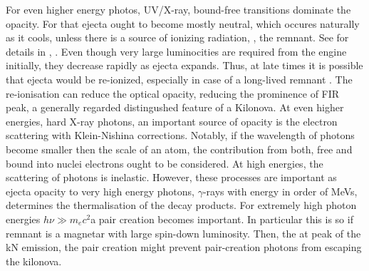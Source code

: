 %
For even higher energy photos, \ac{UV}/X-ray, bound-free transitions dominate the opacity. 
For that ejecta ought to become mostly neutral, which occures naturally as it cools, unless 
there is a source of ionizing radiation, \eg, the remnant. 
See for details in \eg, \citet{Metzger:2013cha}. 
Even though very large luminocities are required from the engine initially, 
they decrease rapidly as ejecta expands. Thus, at late times it is possible that ejecta would be 
re-ionized, especially in case of a long-lived remnant \citep{Metzger:2013cha}. The re-ionisation 
can reduce the optical opacity, reducing the prominence of \ac{FIR} peak, 
a generally regarded distingushed feature of a Kilonova.
%
At even higher energies, hard X-ray photons, an important source of opacity is the 
electron scattering with Klein-Nishina corrections. Notably, if the wavelength of photons 
become smaller then the scale of an atom, the contribution from both, free and bound into 
nuclei electrons ought to be considered. At high energies, the scattering of photons is inelastic. 
However, these processes are important as ejecta opacity to very high energy photons, 
$\gamma$-rays with energy in order of MeVs, determines the thermalisation of the \rproc{} decay products.
%
For extremely high photon energies $h\nu \gg m_e c^2$a pair creation becomes important. 
In particular this is so if remnant is a magnetar with large spin-down luminosity. 
Then, the at peak of the \ac{kN} emission, the pair creation might prevent pair-creation 
photons from escaping the kilonova. 



